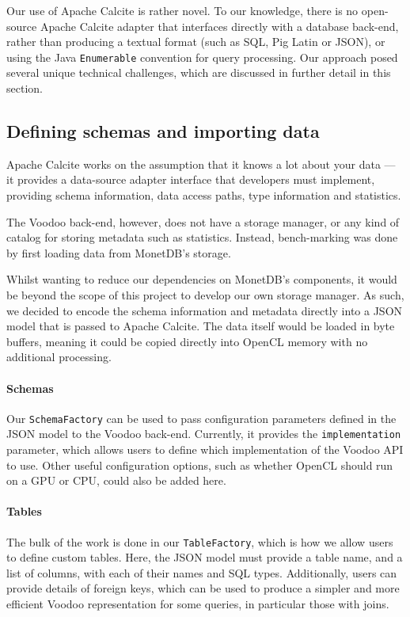 Our use of Apache Calcite is rather novel. To our knowledge, there is no open-source Apache Calcite adapter that interfaces directly with a database back-end, rather than producing a textual format (such as SQL, Pig Latin or JSON), or using the Java \texttt{Enumerable} convention for query processing. Our approach posed several unique technical challenges, which are discussed in further detail in this section.

\subsection{Defining schemas and importing data}

Apache Calcite works on the assumption that it knows a lot about your data — it provides a data-source adapter interface that developers must implement, providing schema information, data access paths, type information and statistics.

The Voodoo back-end, however, does not have a storage manager, or any kind of catalog for storing metadata such as statistics. Instead, bench-marking was done by first loading data from MonetDB's storage.

Whilst wanting to reduce our dependencies on MonetDB's components, it would be beyond the scope of this project to develop our own storage manager. As such, we decided to encode the schema information and metadata directly into a JSON model that is passed to Apache Calcite. The data itself would be loaded in byte buffers, meaning it could be copied directly into OpenCL memory with no additional processing.

\paragraph{Schemas}

Our \texttt{SchemaFactory} can be used to pass configuration parameters defined in the JSON model to the Voodoo back-end. Currently, it provides the \texttt{implementation} parameter, which allows users to define which implementation of the Voodoo API to use. Other useful configuration options, such as whether OpenCL should run on a GPU or CPU, could also be added here.

\paragraph{Tables}

The bulk of the work is done in our \texttt{TableFactory}, which is how we allow users to define custom tables. Here, the JSON model must provide a table name, and a list of columns, with each of their names and SQL types. Additionally, users can provide details of foreign keys, which can be used to produce a simpler and more efficient Voodoo representation for some queries, in particular those with joins.

